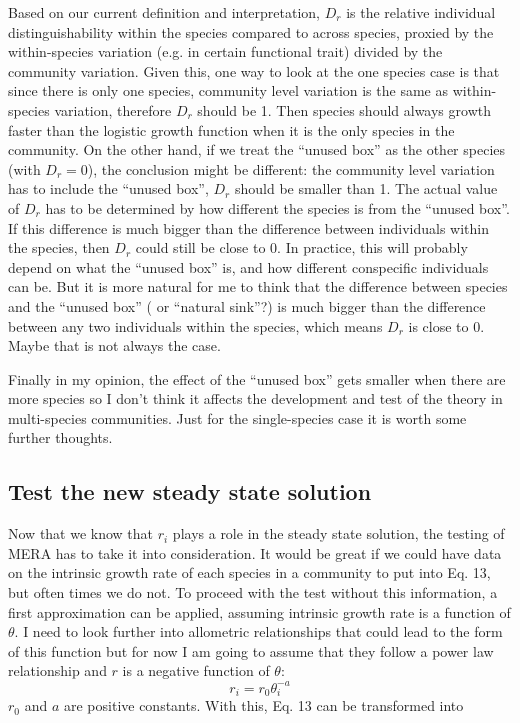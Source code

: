 \documentclass[12pt]{article}
\begin{document}
Based on our current definition and interpretation, $D_r$ is the relative individual distinguishability within the species compared to across species, proxied by the within-species variation (e.g. in certain functional trait) divided by the community variation. Given this, one way to look at the one species case is that since there is only one species, community level variation is the same as within-species variation, therefore $D_r$ should be 1. Then species should always growth faster than the logistic growth function when it is the only species in the community. On the other hand, if we treat the ``unused box'' as the other species (with $D_r=0$), the conclusion might be different: the community level variation has to include the ``unused box'', $D_r$ should be smaller than 1. The actual value of $D_r$ has to be determined by how different the species is from the ``unused box''. If this difference is much bigger than the difference between individuals within the species, then $D_r$ could still be close to 0. In practice, this will probably depend on what the ``unused box'' is, and how different conspecific individuals can be. But it is more natural for me to think that the difference between species and the ``unused box'' ( or ``natural sink''?) is much bigger than the difference between any two individuals within the species, which means $D_r$ is close to 0. Maybe that is not always the case.

Finally in my opinion, the effect of the ``unused box'' gets smaller when there are more species so I don't think it affects the development and test of the theory in multi-species communities. Just for the single-species case it is worth some further thoughts.

\subsection{Test the new steady state solution}

Now that we know that $r_i$ plays a role in the steady state solution, the testing of MERA has to take it into consideration. It would be great if we could have data on the intrinsic growth rate of each species in a community to put into Eq. 13, but often times we do not. To proceed with the test without this information, a first approximation can be applied, assuming intrinsic growth rate is a function of $\theta$. I need to look further into allometric relationships that could lead to the form of this function but for now I am going to assume that they follow a power law relationship and $r$ is a negative function of $\theta$: 
\begin{equation}
r_i = r_0 \theta_i^{-a}
\end{equation}
$r_0$ and $a$ are positive constants. With this, Eq. 13 can be transformed into
\end{document}
